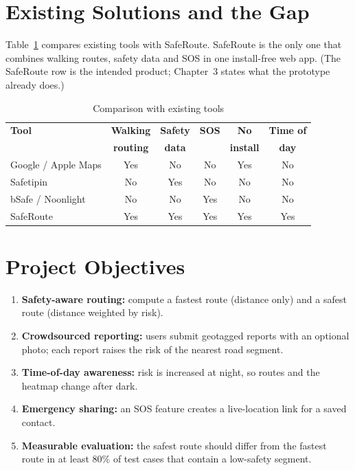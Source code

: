 \documentclass{tietreport}
\begin{document}
\section{Existing Solutions and the Gap}

Table~\ref{tab:existing} compares existing tools with SafeRoute.
SafeRoute is the only one that combines walking routes, safety data
and SOS in one install-free web app. (The SafeRoute row is the
intended product; Chapter~3 states what the prototype already does.)

\begin{table}[h]
\centering
\small
\begin{tabular}{|l|c|c|c|c|c|}
  \hline
  \textbf{Tool} & \textbf{Walking} & \textbf{Safety} & \textbf{SOS} &
  \textbf{No} & \textbf{Time of} \\
  & \textbf{routing} & \textbf{data} & & \textbf{install} & \textbf{day} \\
  \hline
  Google / Apple Maps & Yes & No  & No  & Yes & No  \\ \hline
  Safetipin           & No  & Yes & No  & No  & No  \\ \hline
  bSafe / Noonlight   & No  & No  & Yes & No  & No  \\ \hline
  SafeRoute           & Yes & Yes & Yes & Yes & Yes \\ \hline
\end{tabular}
\caption{Comparison with existing tools}
\label{tab:existing}
\end{table}

\section{Project Objectives}

\begin{enumerate}
  \item \textbf{Safety-aware routing:} compute a fastest route
    (distance only) and a safest route (distance weighted by risk).
  \item \textbf{Crowdsourced reporting:} users submit geotagged
    reports with an optional photo; each report raises the risk of the
    nearest road segment.
  \item \textbf{Time-of-day awareness:} risk is increased at night, so
    routes and the heatmap change after dark.
  \item \textbf{Emergency sharing:} an SOS feature creates a
    live-location link for a saved contact.
  \item \textbf{Measurable evaluation:} the safest route should differ
    from the fastest route in at least 80\% of test cases that contain
    a low-safety segment.
\end{enumerate}
\end{document}
